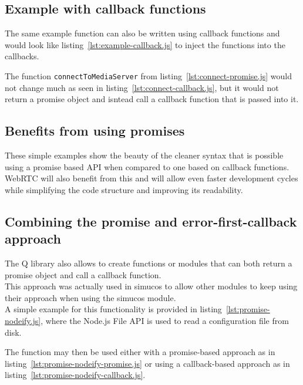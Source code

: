 \documentclass[../../../thesis.tex]{subfiles}
\begin{document}

\subsection{Example with callback functions}
The same example function can also be written using callback functions and would look like listing~\ref{lst:example-callback.js} to inject the functions into the callbacks.


The function \texttt{connectToMediaServer} from listing~\ref{lst:connect-promise.js} would not change much as seen in listing~\ref{lst:connect-callback.js}, but it would not return a promise object and isntead call a callback function that is passed into it.



\subsection{Benefits from using promises}
These simple examples show the beauty of the cleaner syntax that is possible using a promise based API when compared to one based on callback functions.\\

WebRTC will also benefit from this and will allow even faster development cycles while simplifying the code structure and improving its readability.


\subsection{Combining the promise and error-first-callback approach}
The Q library\cite{q-library} also allows to create functions or modules that can both return a promise object and call a callback function.\\
This approach was actually used in simucos to allow other modules to keep using their approach when using the simucos module.\\

A simple example for this functionality is provided in listing~\ref{lst:promise-nodeify.js}, where the Node.js File API is used to read a configuration file from disk.


\noindent
The function may then be used either with a promise-based approach as in listing~\ref{lst:promise-nodeify-promise.js} or using a callback-based approach as in listing~\ref{lst:promise-nodeify-callback.js}.


\end{document}
